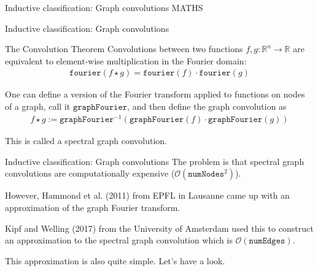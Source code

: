 \documentclass{beamer}
\begin{document}
\begin{frame}{Inductive classification: Graph convolutions}
  \centering\Large MATHS
\end{frame}

\begin{frame}{Inductive classification: Graph convolutions}
  \begin{block}{The Convolution Theorem}
    Convolutions between two functions $f,g\colon\mathbb R^n\to\mathbb R$ 
    are equivalent to element-wise multiplication in the Fourier domain:
    \begin{align*}
      \texttt{fourier}(f\star g) = 
      \texttt{fourier}(f)\cdot\texttt{fourier}(g)
    \end{align*}
  \end{block}

  \pause One can define a version of the Fourier transform applied to 
  functions on nodes of a graph, call it $\texttt{graphFourier}$, and then
  define the graph convolution as
  \begin{align*}
    f\star g := 
    \texttt{graphFourier}^{-1}(
    \texttt{graphFourier}(f)\cdot\texttt{graphFourier}(g))
  \end{align*}

  \pause This is called a \alert<3>{spectral graph convolution}.
\end{frame}

\begin{frame}{Inductive classification: Graph convolutions}
  The problem is that spectral graph convolutions are 
  \alert<1>{computationally expensive} ($\mathcal O(\texttt{numNodes}^2)$).

  \pause However, Hammond et al. (2011) from EPFL in Lausanne came up 
  with an approximation of the graph Fourier transform.

  \pause Kipf and Welling (2017) from the University of Amsterdam used
  this to construct an approximation to the spectral graph convolution 
  which is $\mathcal O(\texttt{numEdges})$.

  \pause This approximation is also quite simple. Let's have a look.
\end{frame}
\end{document}
